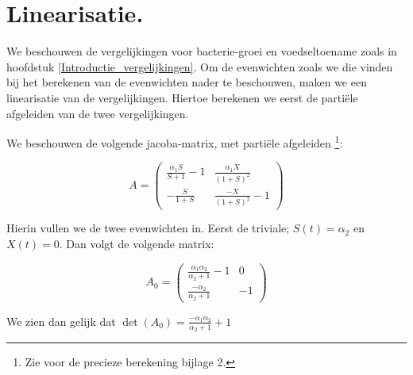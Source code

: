 
\chapter{Linearisatie.}
\label{Linearisatie}

We beschouwen de vergelijkingen voor bacterie-groei en voedseltoename zoals in hoofdstuk \ref{Introductie_vergelijkingen}. Om de evenwichten zoals we die vinden bij het berekenen van de evenwichten nader te beschouwen, maken we een linearisatie van de vergelijkingen. Hiertoe berekenen we eerst de parti\"ele afgeleiden van de twee vergelijkingen. 

We beschouwen de volgende jacoba-matrix, met parti\"ele afgeleiden \footnote{Zie voor de precieze berekening bijlage 2.}: %

\begin{equation*}
	A = 
	\begin{pmatrix}
		\frac{\alpha_1 S}{S + 1} - 1 & \frac{\alpha_1 X}{(1 + S)^2} \\
		-\frac{S}{1 + S} & \frac{-X}{(1 + S)^2} - 1
	\end{pmatrix}
\end{equation*}

Hierin vullen we de twee evenwichten in. Eerst de triviale; $S(t) = \alpha_2$ en $X(t) = 0$. Dan volgt de volgende matrix:

\begin{equation*}
	A_0 = 
	\begin{pmatrix}
		\frac{\alpha_1 \alpha_2}{\alpha_2 + 1} - 1 & 0 \\
		\frac{- \alpha_2}{\alpha_2 + 1} & -1 
	\end{pmatrix}
\end{equation*}

We zien dan gelijk dat $\det(A_0) = \frac{-\alpha_1\alpha_2}{\alpha_2 + 1} + 1$